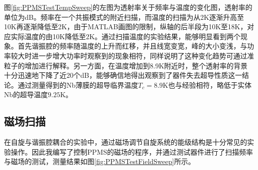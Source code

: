                  图\ref{fig:PPMSTestTempSweep}的左图为透射率关于频率与温度的变化图，透射率的单位为dB。频率在一个共振模式的附近扫描，而温度的扫描为从2K逐渐升高至10K再逐渐降低至2K，由于MATLAB画图的限制，纵轴的后半段为10K至18K，对应实际温度的由10K降低至2K。通过扫描温度的实验结果，能够明显看到两个现象。首先谐振腔的频率随温度的上升而红移，并且线宽变宽，峰的大小变浅，与功率较大时进一步增大功率时观察到的现象相符，同样说明了这种变化趋势可通过准粒子的增加进行解释。另一方面，在温度增加到8.9K附近时，整个透射率的背景十分迅速地下降了近20个dB，能够确信地得出观察到了器件失去超导性质这一结论。通过测量得到的Nb薄膜的超导临界温度$T_c=8.9$K也与经验相符，略低于实体Nb的超导温度$9.25$K\cite{cardarelli2008materials}。
                        

                  \subsection{磁场扫描} %
                  \label{sub:磁场扫描}

                  在自旋与谐振腔耦合的实验中，通过磁场调节自旋系统的能级结构是十分常见的实验操作\cite{kubo2010,PhysRevA.95.022306,Bienfait2016a}。因此我编写了控制PPMS的磁场的程序，并通过测试器件进行了扫描频率与磁场的测试，测量结果如图\ref{fig:PPMSTestFieldSweep}所示。


